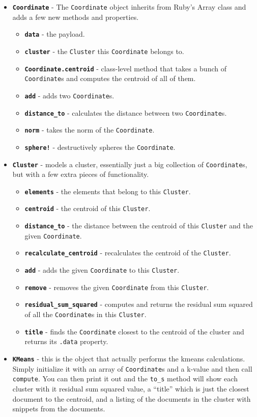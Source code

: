 \documentclass[12pt]{article}
\begin{document}
\begin{itemize}
  \item \texttt{\textbf{Coordinate}} - The \texttt{Coordinate} object inherits from Ruby's Array class and adds a few new methods and properties. \begin{itemize}
    \item \textbf{\texttt{data}} - the payload.
    \item \textbf{\texttt{cluster}} - the \texttt{Cluster} this \texttt{Coordinate} belongs to.
    \item \textbf{\texttt{Coordinate.centroid}} - class-level method that takes a bunch of \texttt{Coordinate}s and computes the centroid of all of them.
    \item \textbf{\texttt{add}} - adds two \texttt{Coordinate}s.
    \item \textbf{\texttt{distance\_to}} - calculates the distance between two \texttt{Coordinate}s.
    \item \textbf{\texttt{norm}} - takes the norm of the \texttt{Coordinate}.
    \item \textbf{\texttt{sphere!}} - destructively spheres the \texttt{Coordinate}.
  \end{itemize}
  \item \textbf{\texttt{Cluster}} - models a cluster, essentially just a big collection of \texttt{Coordinate}s, but with a few extra pieces of functionality. \begin{itemize}
    \item \textbf{\texttt{elements}} - the elements that belong to this \texttt{Cluster}.
    \item \textbf{\texttt{centroid}} - the centroid of this \texttt{Cluster}.
    \item \textbf{\texttt{distance\_to}} - the distance between the centroid of this \texttt{Cluster} and the given \texttt{Coordinate}.
    \item \textbf{\texttt{recalculate\_centroid}} - recalculates the centroid of the \texttt{Cluster}.
    \item \textbf{\texttt{add}} - adds the given \texttt{Coordinate} to this \texttt{Cluster}.
    \item \textbf{\texttt{remove}} - removes the given \texttt{Coordinate} from this \texttt{Cluster}.
    \item \textbf{\texttt{residual\_sum\_squared}} - computes and returns the residual sum squared of all the \texttt{Coordinate}s in this \texttt{Cluster}.
    \item \textbf{\texttt{title}} - finds the \texttt{Coordinate} closest to the centroid of the cluster and returns its \texttt{.data} property.
  \end{itemize}
  \item \textbf{\texttt{KMeans}} - this is the object that actually performs the kmeans calculations. Simply initialize it with an array of \texttt{Coordinate}s and a k-value and then call \texttt{compute}. You can then print it out and the \texttt{to\_s} method will show each cluster with it residual sum squared value, a ``title'' which is just the closest document to the centroid, and a listing of the documents in the cluster with snippets from the documents.
\end{itemize}
\end{document}
